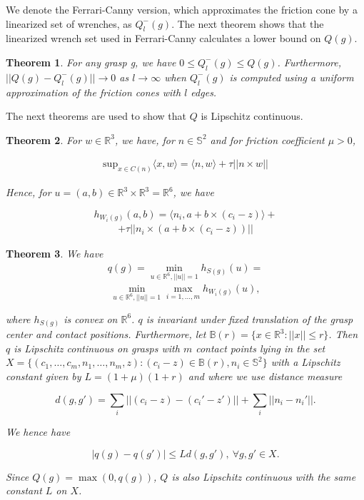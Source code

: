 \documentclass[letterpaper, 10 pt, conference]{ieeeconf}  %
\newtheorem{theorem}{Theorem}
\begin{document}
We denote the Ferrari-Canny version, which approximates the friction cone by a linearized set of wrenches\cite{ferrari1992}, as $Q^-_l(g)$.
The next theorem shows that the linearized wrench set used in Ferrari-Canny calculates a lower bound on $Q(g)$.\\

\begin{theorem}
  \cite{pokorny2013classical}
For any grasp g, we have $0 \leq Q_l^-(g) \leq Q(g)$.
Furthermore, $||Q(g) - Q^-_l(g)|| \rightarrow 0$ as $l \rightarrow \infty$ when $Q_l^-(g)$ is computed using a uniform approximation of the friction cones with $l$ edges. \\
\end{theorem}

The next theorems are used to show that $Q$ is Lipschitz continuous.

\begin{theorem}
\label{lemma35}
  \cite{pokorny2013classical}
For $w \in \mathbb{R}^3$, we have, for $n \in \mathbb{S}^2$ and for friction coefficient $\mu > 0$, 

\begin{align}
\mbox{sup}_{x \in C(n)} \langle x,w \rangle = \langle n,w \rangle + \tau||n \times w||
\end{align}

Hence, for $u = (a,b) \in \mathbb{R}^3 \times \mathbb{R}^3 = \mathbb{R}^6$, we have 

\[
h_{W_i(g)}(a,b) =
 \langle n_i,a+b\times(c_i-z)\rangle +
\]
\begin{align}
 +\tau ||n_i \times (a+b\times(c_i-z))||
\end{align}

\end{theorem}

\begin{theorem}
  \cite{pokorny2013classical}
We have \\

\begin{align}
q(g) 
=
\min_{u\in \mathbb{R}^6, ||u|| =1} h_{S(g)}(u) 
=
\end{align}
\[
\min_{u\in \mathbb{R}^6, ||u|| =1} \max_{i=1,...,m} h_{W_i(g)}(u),
\]

where $h_{S(g)}$ is convex on $\mathbb{R}^6$.
$q$ is invariant under fixed translation of the grasp center and contact positions.
Furthermore, let $\mathbb{B}(r) = \lbrace x \in \mathbb{R}^3 : ||x|| \leq r \rbrace$.
Then $q$ is Lipschitz continuous on grasps with $m$ contact points lying in the set $X = \lbrace (c_1, \dots, c_m,n_1, \dots,n_m,z) : (c_i-z) \in \mathbb{B}(r), n_i \in \mathbb{S}^2 \rbrace$ with a Lipschitz constant given by $L= (1+\mu)(1+r)$ and where we use distance measure 

\[
  d(g,g') = \sum_i ||(c_i-z)-(c_i'-z')|| + \sum_i ||n_i - n_i'||.
\]

We hence have 

\[
|q(g) - q(g')| \leq Ld(g,g'),\  \forall g,g' \in X.
\]

Since $Q(g) = \max(0,q(g))$, $Q$ is also Lipschitz continuous with the same constant $L$ on $X$. 
\end{theorem}
\end{document}
